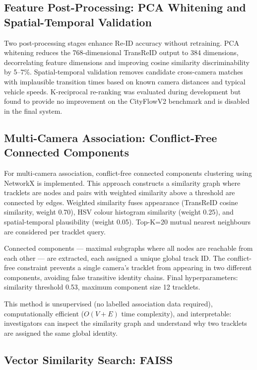 \subsection{Feature Post-Processing: PCA Whitening and Spatial-Temporal Validation}

Two post-processing stages enhance Re-ID accuracy without retraining. PCA whitening reduces the 768-dimensional TransReID output to 384 dimensions, decorrelating feature dimensions and improving cosine similarity discriminability by 5--7\%. Spatial-temporal validation removes candidate cross-camera matches with implausible transition times based on known camera distances and typical vehicle speeds. K-reciprocal re-ranking was evaluated during development but found to provide no improvement on the CityFlowV2 benchmark and is disabled in the final system.

\subsection{Multi-Camera Association: Conflict-Free Connected Components}

For multi-camera association, conflict-free connected components clustering using NetworkX is implemented. This approach constructs a similarity graph where tracklets are nodes and pairs with weighted similarity above a threshold are connected by edges. Weighted similarity fuses appearance (TransReID cosine similarity, weight 0.70), HSV colour histogram similarity (weight 0.25), and spatial-temporal plausibility (weight 0.05). Top-K=20 mutual nearest neighbours are considered per tracklet query.

Connected components — maximal subgraphs where all nodes are reachable from each other — are extracted, each assigned a unique global track ID. The conflict-free constraint prevents a single camera's tracklet from appearing in two different components, avoiding false transitive identity chains. Final hyperparameters: similarity threshold 0.53, maximum component size 12 tracklets.

This method is unsupervised (no labelled association data required), computationally efficient ($O(V+E)$ time complexity), and interpretable: investigators can inspect the similarity graph and understand why two tracklets are assigned the same global identity.

\subsection{Vector Similarity Search: FAISS}

